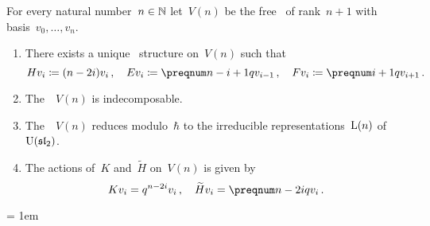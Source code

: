 \documentclass[a4paper, 11pt, oneside]{scrartcl}
\begin{document}
\begin{theorem}
  For every natural number~$n \in \mathbb{N}$ let~$V(n)$ be the free~\module{$\kfhbar$} of rank~$n+1$ with basis~$v_0, \dotsc, v_n$.
  \begin{enumerate}
    \item
      There exists a unique~ structure on~$V(n)$ such that
      \[
        H v_i \defined (n - 2i) v_i \,,
        \quad
        E v_i \defined \qnum{n - i + 1} v_{i-1} \,,
        \quad
        F v_i \defined \qnum{i+1} v_{i+1} \,.
      \]
    \item
      The~~$V(n)$ is indecomposable.
    \item
      The~~$V(n)$ reduces modulo~$\hbar$ to the irreducible representations~$\operatorname{L}(n)$ of~$\operatorname{U}(\mathfrak{sl}_2)$.
    \item
      The actions of~$K$ and~$\widetilde{H}$ on~$V(n)$ is given by
      \[
        K v_i
        =
        q^{n - 2i} v_i \,,
        \quad
        \widetilde{H} v_i
        =
        \qnum{n - 2i} v_i \,.
      \]
  \end{enumerate}
\end{theorem}





\emergencystretch = 1em
\printbibliography
\end{document}
